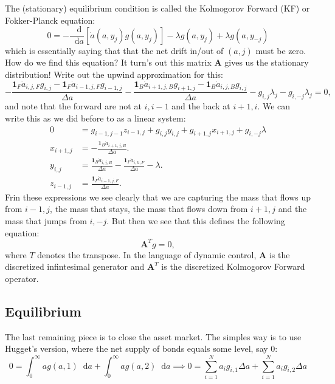 \documentclass[12pt]{article}
\DeclareMathOperator{\1}{\mathbbm{1}}
\newcommand*\diff{\mathop{}\!\mathrm{d}}
\begin{document}
The (stationary) equilibrium condition is called the Kolmogorov Forward (KF) or Fokker-Planck equation:
\begin{equation}
0 = - \frac{\diff}{\diff a} [\dot a(a,y_j)g(a,y_j)] - \lambda g(a,y_j) + \lambda g(a,y_{-j})
\end{equation}
which is essentially saying that that the net drift in/out of $(a,j)$ must be zero. How do we find this equation? It turn's out this matrix $\mathbf{A}$ gives us the stationary distribution! Write out the upwind approximation for this:
\begin{equation*}
-\frac{\mathbf{1}_F \dot a_{i,j,F} g_{i,j} - \mathbf{1}_F \dot a_{i-1,j,F} g_{i-1,j}}{\Delta a} - \frac{\mathbf{1}_B \dot a_{i+1,j,B} g_{i+1,j} - \mathbf{1}_B \dot a_{i,j,B} g_{i,j}}{\Delta a} - g_{i,j}\lambda_j - g_{i,-j}\lambda_j=0,
\end{equation*}
and note that the forward are not at $i,i-1$ and the back at $i+1,i$. We can write this as we did before to as a linear system:
\begin{align*}
0&=g_{i-1,j-1} z_{i-1,j} + g_{i,j} y_{i,j} + g_{i+1,j} x_{i+1,j} + g_{i,-j}\lambda \\
x_{i+1,j} &=  -\frac{\mathbf{1}_B \dot a_{i+1,j,B}}{\Delta a}. \\
y_{i,j} &=  \frac{\mathbf{1}_B \dot a_{i,j,B}}{\Delta a} -\frac{\mathbf{1}_F \dot a_{i,h,F}}{\Delta a} - \lambda. \\
z_{i-1,j} &= \frac{\mathbf{1}_F \dot a_{i-1,j,F}}{\Delta a}.
\end{align*}
Frin these expressions we see clearly that we are capturing the mass that flows up from $i-1,j$, the mass that stays, the mass that flows down from $i+1,j$ and the mass that jumps from $i,-j$. But then we see that this defines the following equation:
\begin{equation}
\mathbf{A}^{T}g = 0,
\end{equation}
where $T$ denotes the transpose. In the language of dynamic control, $\mathbf{A}$ is the discretized infintesimal generator and $\mathbf{A}^T$ is the discretized Kolmogorov Forward operator.

\subsection{Equilibrium}
The last remaining piece is to close the asset market. The simples way is to use Hugget's version, where the net supply of bonds equals some level, say 0:
\begin{equation}
0=\int_0^\infty ag(a,1) \diff a  + \int_0^\infty ag(a,2) \diff a  \implies  0=\sum_{i=1}^N a_ig_{i,1} \Delta a + \sum_{i=1}^N a_ig_{i,2} \Delta a
\end{equation}
\end{document}
